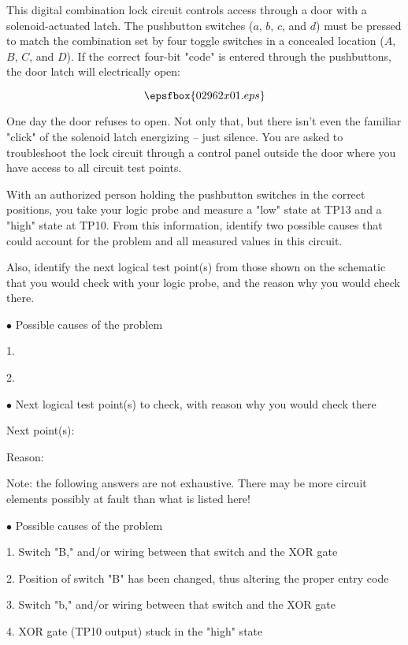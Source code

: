 

This digital combination lock circuit controls access through a door with a solenoid-actuated latch.  The pushbutton switches ($a$, $b$, $c$, and $d$) must be pressed to match the combination set by four toggle switches in a concealed location ($A$, $B$, $C$, and $D$).  If the correct four-bit "code" is entered through the pushbuttons, the door latch will electrically open:

$$\epsfbox{02962x01.eps}$$

One day the door refuses to open.  Not only that, but there isn't even the familiar "click" of the solenoid latch energizing -- just silence.  You are asked to troubleshoot the lock circuit through a control panel outside the door where you have access to all circuit test points.

With an authorized person holding the pushbutton switches in the correct positions, you take your logic probe and measure a "low" state at TP13 and a "high" state at TP10.  From this information, identify two possible causes that could account for the problem and all measured values in this circuit.

Also, identify the next logical test point(s) from those shown on the schematic that you would check with your logic probe, and the reason why you would check there.

\medskip
\item{$\bullet$} Possible causes of the problem
\item{1.}
\item{2.} 
\medskip

\medskip
\item{$\bullet$} Next logical test point(s) to check, with reason why you would check there
\item{Next point(s):}
\item{Reason:}
\medskip







Note: the following answers are not exhaustive.  There may be more circuit elements possibly at fault than what is listed here!

\medskip
\goodbreak
\item{$\bullet$} Possible causes of the problem
\item{1.} Switch "B," and/or wiring between that switch and the XOR gate
\item{2.} Position of switch "B" has been changed, thus altering the proper entry code
\item{3.} Switch "b," and/or wiring between that switch and the XOR gate
\item{4.} XOR gate (TP10 output) stuck in the "high" state
\medskip

